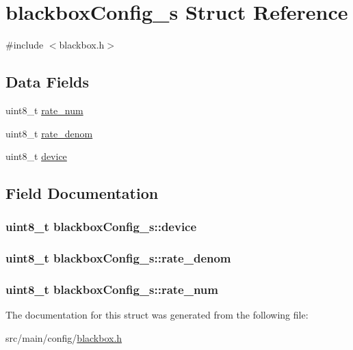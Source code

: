 \hypertarget{structblackboxConfig__s}{\section{blackbox\+Config\+\_\+s Struct Reference}
\label{structblackboxConfig__s}
}


{\ttfamily \#include $<$blackbox.\+h$>$}

\subsection*{Data Fields}
\begin{DoxyCompactItemize}
\item 
uint8\+\_\+t \hyperlink{structblackboxConfig__s_a979abd90278bb588d5d3b0ed36287697}{rate\+\_\+num}
\item 
uint8\+\_\+t \hyperlink{structblackboxConfig__s_a128823a17c0bd1ddb217ab74162b2b79}{rate\+\_\+denom}
\item 
uint8\+\_\+t \hyperlink{structblackboxConfig__s_ae88a8fe2f694d7bb40a94596da893854}{device}
\end{DoxyCompactItemize}


\subsection{Field Documentation}
\hypertarget{structblackboxConfig__s_ae88a8fe2f694d7bb40a94596da893854}{
\subsubsection[{device}]{\setlength{\rightskip}{0pt plus 5cm}uint8\+\_\+t blackbox\+Config\+\_\+s\+::device}}\label{structblackboxConfig__s_ae88a8fe2f694d7bb40a94596da893854}
\hypertarget{structblackboxConfig__s_a128823a17c0bd1ddb217ab74162b2b79}{
\subsubsection[{rate\+\_\+denom}]{\setlength{\rightskip}{0pt plus 5cm}uint8\+\_\+t blackbox\+Config\+\_\+s\+::rate\+\_\+denom}}\label{structblackboxConfig__s_a128823a17c0bd1ddb217ab74162b2b79}
\hypertarget{structblackboxConfig__s_a979abd90278bb588d5d3b0ed36287697}{
\subsubsection[{rate\+\_\+num}]{\setlength{\rightskip}{0pt plus 5cm}uint8\+\_\+t blackbox\+Config\+\_\+s\+::rate\+\_\+num}}\label{structblackboxConfig__s_a979abd90278bb588d5d3b0ed36287697}


The documentation for this struct was generated from the following file\+:\begin{DoxyCompactItemize}
\item 
src/main/config/\hyperlink{config_2blackbox_8h}{blackbox.\+h}\end{DoxyCompactItemize}
